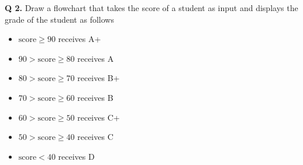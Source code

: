 \documentclass{article}
\begin{document}
\clearpage

\begin{flushleft}

\textbf{Q 2.} Draw a flowchart that takes the score of a student as input and 
displays the grade of the student as follows

\begin{itemize}
    \item $\text{score} \geq 90$ receives A+
    \item $90 > \text{score} \geq 80$ receives A
    \item $80 > \text{score} \geq 70$ receives B+
    \item $70 > \text{score} \geq 60$ receives B
    \item $60 > \text{score} \geq 50$ receives C+
    \item $50 > \text{score} \geq 40$ receives C
    \item $\text{score} < 40$ receives D
\end{itemize}

\end{flushleft}
\end{document}
